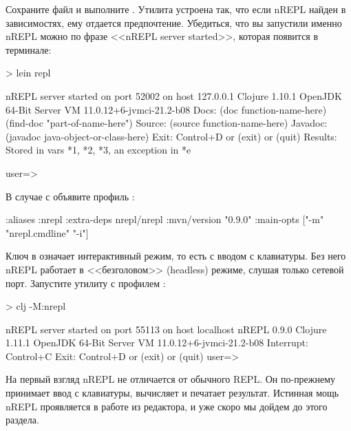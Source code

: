 Сохраните файл и выполните . Утилита  устроена так, что если nREPL найден в зависимостях, ему отдается предпочтение. Убедиться, что вы запустили именно nREPL можно по фразе <<nREPL server started>>, которая появится в терминале:

\begin{english}
  \begin{text}
> lein repl

nREPL server started on port 52002 on host 127.0.0.1
Clojure 1.10.1
OpenJDK 64-Bit Server VM 11.0.12+6-jvmci-21.2-b08
    Docs: (doc function-name-here)
          (find-doc "part-of-name-here")
  Source: (source function-name-here)
 Javadoc: (javadoc java-object-or-class-here)
    Exit: Control+D or (exit) or (quit)
 Results: Stored in vars *1, *2, *3, an exception in *e

user=>
  \end{text}
\end{english}

В случае с  объявите профиль :

\begin{english}
  \begin{clojure/lines}
{:aliases
 {:nrepl
  {:extra-deps
   {nrepl/nrepl {:mvn/version "0.9.0"}}
   :main-opts ["-m" "nrepl.cmdline" "-i"]}}}
  \end{clojure/lines}
\end{english}

Ключ  в   означает интерактивный режим, то есть с вводом с клавиатуры. Без него nREPL работает в <<безголовом>> (headless) режиме, слушая только сетевой порт. Запустите утилиту  с профилем :

\begin{english}
  \begin{text}
> clj -M:nrepl

nREPL server started on port 55113 on host localhost
nREPL 0.9.0
Clojure 1.11.1
OpenJDK 64-Bit Server VM 11.0.12+6-jvmci-21.2-b08
Interrupt: Control+C
Exit:      Control+D or (exit) or (quit)
user=>
  \end{text}
\end{english}

На первый взгляд nREPL не отличается от обычного REPL. Он по-прежнему принимает ввод с клавиатуры, вычисляет и печатает результат. Истинная мощь nREPL проявляется в работе из редактора, и уже скоро мы дойдем до этого раздела.

